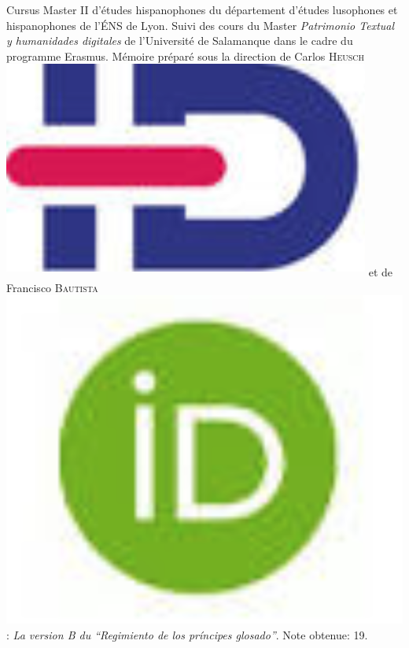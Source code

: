 \begin{rubric}{Cursus}
                                \entry*[2015-2016]
                             Master II d'études hispanophones du département
                        d'études lusophones et hispanophones de l'ÉNS de Lyon.
                        Suivi des cours du Master \textit{Patrimonio Textual y
                        humanidades digitales} de l’Université de
                        Salamanque dans le cadre du programme Erasmus. Mémoire
                        préparé sous la direction de Carlos \textsc{Heusch}\href{https://www.idref.fr/055838413}{\textsuperscript{\includegraphics[scale=0.025]{img/idref.png}}} et de Francisco
                        \textsc{Bautista}\href{https://orcid.org/0000-0002-2676-0388}{\includegraphics[scale=0.025]{img/orcid.png}}: \textit{La version B du
                        ``Regimiento de los príncipes
                        glosado''}. Note obtenue: 19. 
                    

\end{rubric}

